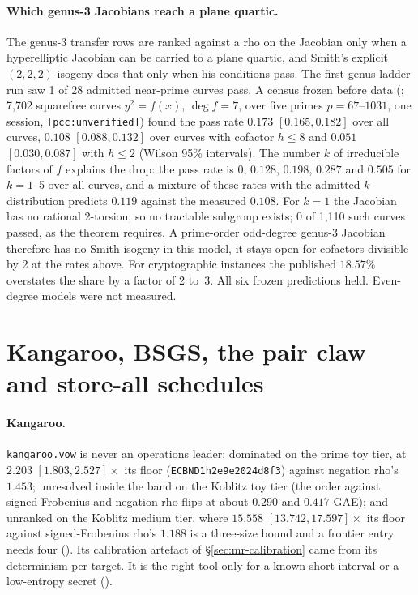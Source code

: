\paragraph{Which genus-3 Jacobians reach a plane quartic.} The genus-3
transfer rows are ranked against a rho on the Jacobian only when a
hyperelliptic Jacobian can be carried to a plane quartic, and Smith's
explicit $(2,2,2)$-isogeny does that only when his conditions pass. The
first genus-ladder run saw 1 of 28 admitted near-prime curves pass. A census
frozen before data (;
7{,}702 squarefree curves $y^2=f(x)$, $\deg f=7$, over five primes
$p=67$--$1031$, one session, \texttt{[pcc:unverified]}) found the pass rate
$0.173$ $[0.165,0.182]$ over all curves, $0.108$ $[0.088,0.132]$ over curves
with cofactor $h\le8$ and $0.051$ $[0.030,0.087]$ with $h\le2$ (Wilson 95\%
intervals). The number $k$ of irreducible factors of $f$ explains the drop:
the pass rate is $0$, $0.128$, $0.198$, $0.287$ and $0.505$ for $k=1$--5
over all curves, and a mixture of these rates with the admitted
$k$-distribution predicts $0.119$ against the measured $0.108$. For $k=1$
the Jacobian has no rational 2-torsion, so no tractable subgroup exists; 0
of 1{,}110 such curves passed, as the theorem requires. A prime-order
odd-degree genus-3 Jacobian therefore has no Smith isogeny in this model,
it stays open for cofactors divisible by 2 at the rates above. For
cryptographic instances the published $18.57\%$ overstates the share by a
factor of 2 to~3. All six frozen
predictions held. Even-degree models were not measured.

\section{Kangaroo, BSGS, the pair claw and store-all schedules}\label{sec:rv-memory}

\paragraph{Kangaroo.} \texttt{kangaroo.vow} is never an operations
leader: dominated on the prime toy tier, at $2.203$ $[1.803,2.527]\times$
its floor (\texttt{ECBND1h2e9e2024d8f3}) against negation rho's $1.453$;
unresolved inside the band on the Koblitz toy tier (the order against
signed-Frobenius and negation rho flips at about $0.290$ and $0.417$ GAE);
and unranked on the Koblitz medium tier, where $15.558$
$[13.742,17.597]\times$ its floor against signed-Frobenius rho's $1.188$ is
a three-size bound and a frontier entry needs four
(). Its
calibration artefact of \S\ref{sec:mr-calibration} came from its
determinism per target. It is the right tool only for a known short
interval or a low-entropy secret
().

